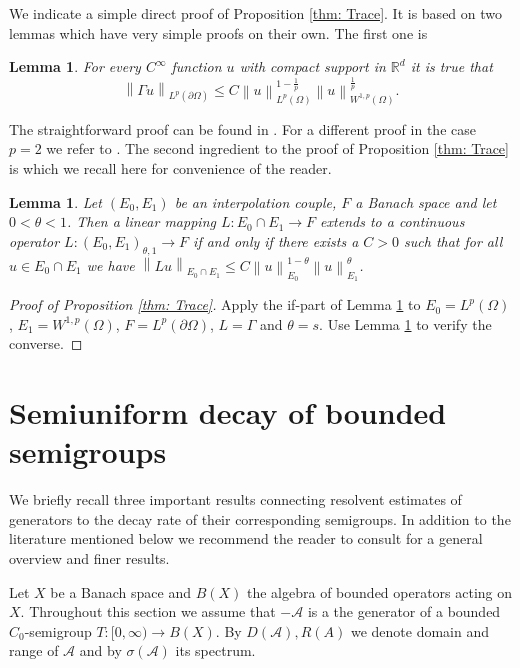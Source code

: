 \documentclass{amsart}
\newcommand{\norm}[1]{\left\| #1 \right\|}
\newcommand{\A}{\mathcal{A}}
\newcommand{\R}{\mathbb{R}}
\newtheorem{Lemma}[Theorem]{Lemma}
\begin{document}
\begin{appendix}
We indicate a simple direct proof of Proposition \ref{thm: Trace}. It is based on two lemmas which have very simple proofs on their own. The first one is
\begin{Lemma}\label{thm: trace inequality}
 For every $C^{\infty}$ function $u$ with compact support in $\R^d$ it is true that
 \begin{equation}\nonumber
  \norm{\Gamma u}_{L^p(\partial\Omega)} \leq C\norm{u}_{L^p(\Omega)}^{1-\frac{1}{p}}\norm{u}_{W^{1,p}(\Omega)}^{\frac{1}{p}}.
 \end{equation}
\end{Lemma}
The straightforward proof can be found in \cite[Lemma 13.1]{Tartar}. For a different proof in the case $p=2$ we refer to \cite{Monniaux2014}. The second ingredient to the proof of Proposition \ref{thm: Trace} is \cite[Lemma 25.3]{Tartar} which we recall here for convenience of the reader.
\begin{Lemma}\label{thm: interpolation lemma}
 Let $(E_0,E_1)$ be an interpolation couple, $F$ a Banach space and let $0<\theta<1$. Then a linear mapping $L:E_0\cap E_1\rightarrow F$ extends to a continuous operator $L:(E_0,E_1)_{\theta, 1}\rightarrow F$ if and only if there exists a $C>0$ such that for all $u\in E_0\cap E_1$ we have $\norm{Lu}_{E_0 \cap E_1}\leq C\norm{u}_{E_0}^{1-\theta}\norm{u}_{E_1}^{\theta}$.
\end{Lemma}
\begin{proof}[Proof of Proposition \ref{thm: Trace}]
Apply the if-part of Lemma \ref{thm: interpolation lemma} to $E_0=L^p(\Omega)$, $E_1=W^{1,p}(\Omega)$, $F=L^p(\partial\Omega)$, $L=\Gamma$ and $\theta=s$. Use Lemma \ref{thm: trace inequality} to verify the converse. 
\end{proof}

\section{Semiuniform decay of bounded semigroups}\label{apx: semiuniform stability}
We briefly recall three important results connecting resolvent estimates of generators to the decay rate of their corresponding semigroups. In addition to the literature mentioned below we recommend the reader to consult \cite{BattyChillTomilov2016} for a general overview and finer results.

Let $X$ be a Banach space and $B(X)$ the algebra of bounded operators acting on $X$. Throughout this section we assume that $-\A$ is a the generator of a bounded $C_0$-semigroup $T:[0,\infty)\rightarrow B(X)$. By $D(\A), R(A)$ we denote domain and range of $\A$ and by $\sigma(\A)$ its spectrum.


\end{appendix}
\end{document}
